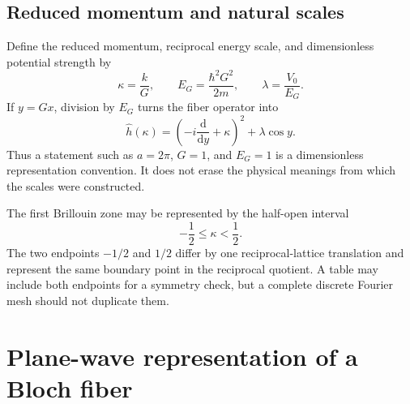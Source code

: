 \subsection{Reduced momentum and natural scales}

Define the reduced momentum, reciprocal energy scale, and dimensionless
potential strength by
\begin{equation}
  \kappa=\frac{k}{G},
  \qquad
  E_G=\frac{\hbar^2G^2}{2m},
  \qquad
  \lambda=\frac{V_0}{E_G}.
  \label{eq:training-isolated-scales}
\end{equation}
If $y=Gx$, division by $E_G$ turns the fiber operator into
\begin{equation}
  \widehat h(\kappa)
  =\left(-i\frac{\mathrm d}{\mathrm d y}+\kappa\right)^2
   +\lambda\cos y.
  \label{eq:training-isolated-dimensionless-fiber}
\end{equation}
Thus a statement such as $a=2\pi$, $G=1$, and $E_G=1$ is a dimensionless
representation convention. It does not erase the physical meanings from which
the scales were constructed.

The first Brillouin zone may be represented by the half-open interval
\begin{equation}
  -\frac12\leq\kappa<\frac12.
  \label{eq:training-isolated-first-zone}
\end{equation}
The two endpoints $-1/2$ and $1/2$ differ by one reciprocal-lattice translation
and represent the same boundary point in the reciprocal quotient. A table may
include both endpoints for a symmetry check, but a complete discrete Fourier
mesh should not duplicate them.

\section{Plane-wave representation of a Bloch fiber}

